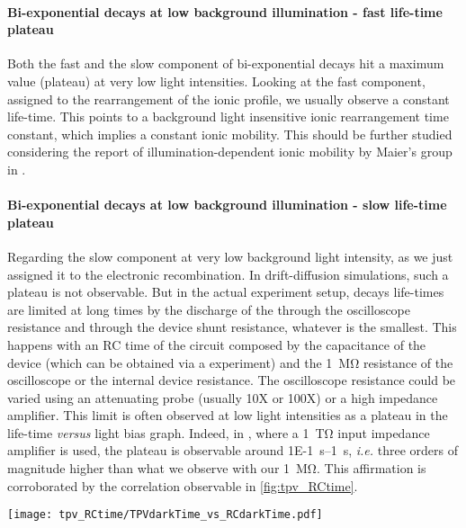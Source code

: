 	\paragraph{Bi-exponential decays at low background illumination - fast life-time plateau}
	Both the fast and the slow component of bi-exponential decays hit a maximum value (plateau) at very low light intensities.
	Looking at the fast component, assigned to the rearrangement of the ionic profile, we usually observe a constant life-time.
	This points to a background light insensitive ionic rearrangement time constant, which implies a constant ionic mobility.
	This should be further studied considering the report of illumination-dependent ionic mobility by Maier's group in .
		
	\paragraph{Bi-exponential decays at low background illumination - slow life-time plateau}
	Regarding the slow component at very low background light intensity, as we just assigned it to the electronic recombination.
	In drift-diffusion simulations, such a plateau is not observable.
	But in the actual experiment setup, decays life-times are limited at long times by the discharge of the through the oscilloscope resistance and through the device shunt resistance, whatever is the smallest.
	This happens with an RC time of the circuit composed by the capacitance of the device (which can be obtained via a  experiment) and the \SI{1}{\Mohm} resistance of the oscilloscope or the internal device resistance.
	The oscilloscope resistance could be varied using an attenuating probe (usually 10X or 100X) or a high impedance amplifier.
	This limit is often observed at low light intensities as a plateau in the  life-time \textit{versus} light bias graph.
	Indeed, in , where a \SI{1}{\tera\ohm} input impedance amplifier is used, the plateau is observable around \SIrange{1E-1}{1}{\s}, \textit{i.e.} three orders of magnitude higher than what we observe with our \SI{1}{\Mohm}.
	This affirmation is corroborated by the correlation observable in \cref{fig:tpv_RCtime}.
	
	\begin{SCfigure}
		\centering
		\texttt{[image: tpv\_RCtime/TPVdarkTime\_vs\_RCdarkTime.pdf]}
		\label{fig:tpv_RCtime}
	\end{SCfigure}
	
